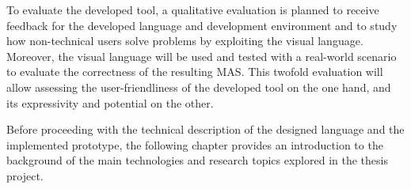 To evaluate the developed tool, a qualitative evaluation is planned to receive feedback for the developed language and development environment and to study how non-technical users solve problems by exploiting the visual language.
Moreover, the visual language will be used and tested with a real-world scenario to evaluate the correctness of the resulting MAS.
This twofold evaluation will allow assessing the user-friendliness of the developed tool on the one hand, and its expressivity and potential on the other.

Before proceeding with the technical description of the designed language and the implemented prototype, the following chapter provides an introduction to the background of the main technologies and research topics explored in the thesis project.